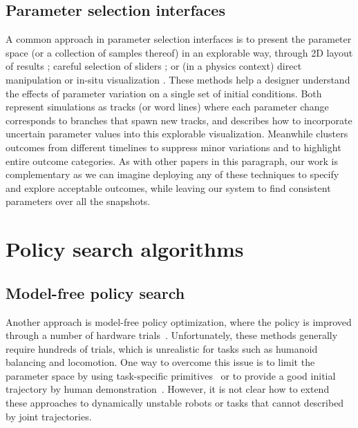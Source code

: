 \subsection{Parameter selection interfaces}
A common approach in parameter selection interfaces is to present the parameter space (or a collection of samples thereof) in an explorable way,
through 2D layout of results \cite{Marks:1997:DGA};
careful selection of sliders \cite{Ovsjanikov:2011:Shapes,Lindow:2012:PLP};
or (in a physics context) direct manipulation \cite{Popovic:2000:IMR}
or in-situ visualization \cite{Twigg:2007:MWB}.
These methods help a designer understand the effects of parameter variation on a single set of initial conditions.
Both \cite{WFR:2010:WL,WFR:2011:NOR} represent simulations as tracks (or word lines) 
where each parameter change corresponds to branches that spawn new tracks, and 
\cite{WFR:2010:WL} describes how to incorporate uncertain parameter values into this explorable visualization.  
Meanwhile \cite{BM:2010:RDE} clusters outcomes from different timelines to suppress minor variations and to highlight entire outcome categories. 
As with other papers in this paragraph, 
our work is complementary as we can imagine deploying any of these techniques to specify and explore acceptable outcomes, 
while leaving our system to find consistent parameters over all the snapshots.



\section{Policy search algorithms}
\label{sec:related_policy}

\subsection{Model-free policy search}
Another approach is model-free policy optimization, where the policy is
improved through a number of hardware trials~\cite{bib-morimoto-standup,bib-kober-primitives}.
Unfortunately, these methods generally require hundreds of
trials, which is unrealistic for tasks such as humanoid balancing and
locomotion.
One way to overcome this issue is to limit the parameter space by using
task-specific primitives~\cite{bib-nakanishi-adaptation} or to provide a
good initial trajectory by human
demonstration~\cite{bib-atkeson-demonstration}.
However, it is not clear how to extend these approaches to dynamically
unstable robots or tasks that cannot described by joint trajectories.

